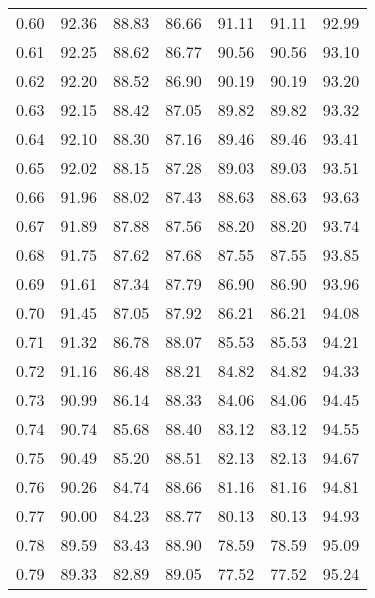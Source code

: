\begin{tabular}{|c|c|c|c|c|c|c|}
      0.60 &     92.36 &     88.83 &      86.66 &   91.11 &      91.11 &         92.99 \\
      0.61 &     92.25 &     88.62 &      86.77 &   90.56 &      90.56 &         93.10 \\
      0.62 &     92.20 &     88.52 &      86.90 &   90.19 &      90.19 &         93.20 \\
      0.63 &     92.15 &     88.42 &      87.05 &   89.82 &      89.82 &         93.32 \\
      0.64 &     92.10 &     88.30 &      87.16 &   89.46 &      89.46 &         93.41 \\
      0.65 &     92.02 &     88.15 &      87.28 &   89.03 &      89.03 &         93.51 \\
      0.66 &     91.96 &     88.02 &      87.43 &   88.63 &      88.63 &         93.63 \\
      0.67 &     91.89 &     87.88 &      87.56 &   88.20 &      88.20 &         93.74 \\
      0.68 &     91.75 &     87.62 &      87.68 &   87.55 &      87.55 &         93.85 \\
      0.69 &     91.61 &     87.34 &      87.79 &   86.90 &      86.90 &         93.96 \\
      0.70 &     91.45 &     87.05 &      87.92 &   86.21 &      86.21 &         94.08 \\
      0.71 &     91.32 &     86.78 &      88.07 &   85.53 &      85.53 &         94.21 \\
      0.72 &     91.16 &     86.48 &      88.21 &   84.82 &      84.82 &         94.33 \\
      0.73 &     90.99 &     86.14 &      88.33 &   84.06 &      84.06 &         94.45 \\
      0.74 &     90.74 &     85.68 &      88.40 &   83.12 &      83.12 &         94.55 \\
      0.75 &     90.49 &     85.20 &      88.51 &   82.13 &      82.13 &         94.67 \\
      0.76 &     90.26 &     84.74 &      88.66 &   81.16 &      81.16 &         94.81 \\
      0.77 &     90.00 &     84.23 &      88.77 &   80.13 &      80.13 &         94.93 \\
      0.78 &     89.59 &     83.43 &      88.90 &   78.59 &      78.59 &         95.09 \\
      0.79 &     89.33 &     82.89 &      89.05 &   77.52 &      77.52 &         95.24 \\

\end{tabular}
